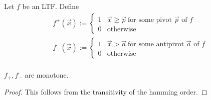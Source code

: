 \begin{definition}\label{defmonoparts}
		Let $f$ be an LTF. Define 
	\begin{align*}
	f^+(\vec{x}) := \begin{cases}
	1 & \vec{x} \geq \vec{p}~ \text{for some pivot $\vec{p}$ of $f$}\\
	0 & \text{otherwise}
	\end{cases}\\
	f^-(\vec{x}) := \begin{cases}
	1 & \vec{x} > \vec{a}~ \text{for some antipivot $\vec{a}$ of $f$}\\
	0 & \text{otherwise}
	\end{cases}\\
	\end{align*}
\end{definition}
\begin{proposition}\label{mono parts are mono}
	$f_+,f_-$ are monotone.
\end{proposition}
\begin{proof}
	This follows from the transitivity of the hamming order.
\end{proof}

